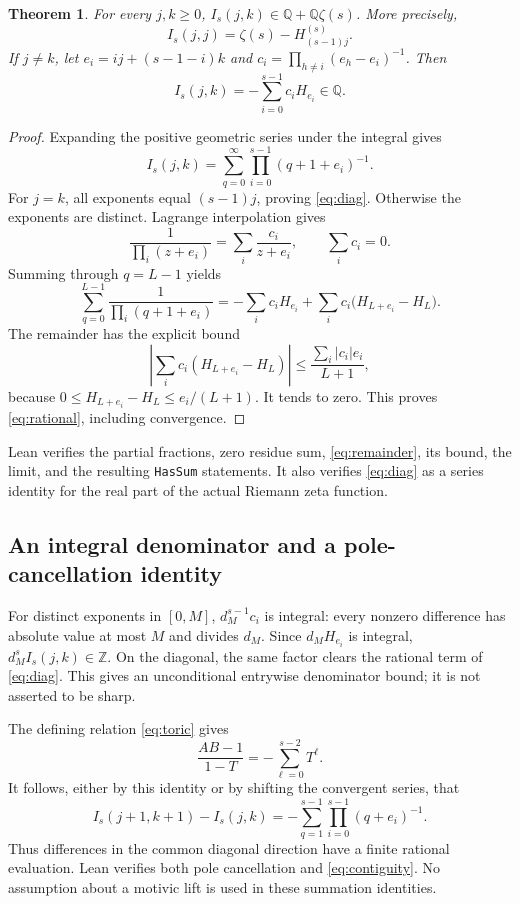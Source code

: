 \documentclass[11pt]{article}
\newtheorem{theorem}{Theorem}
\newcommand{\Q}{\mathbb Q}
\newcommand{\Z}{\mathbb Z}
\newcommand{\HH}[2]{H_{#1}^{(#2)}}
\begin{document}
\begin{theorem}
For every $j,k\ge0$, $I_s(j,k)\in\Q+\Q\zeta(s)$. More precisely,
\begin{equation}
 I_s(j,j)=\zeta(s)-\HH{(s-1)j}{s}.
 \label{eq:diag}
\end{equation}
If $j\ne k$, let $e_i=ij+(s-1-i)k$ and
$c_i=\prod_{h\ne i}(e_h-e_i)^{-1}$. Then
\begin{equation}
 I_s(j,k)=-\sum_{i=0}^{s-1}c_iH_{e_i}\in\Q .
 \label{eq:rational}
\end{equation}
\end{theorem}
\begin{proof}
Expanding the positive geometric series under the integral gives
\[
 I_s(j,k)=\sum_{q=0}^{\infty}
              \prod_{i=0}^{s-1}(q+1+e_i)^{-1}.
\]
For $j=k$, all exponents equal $(s-1)j$, proving \eqref{eq:diag}.
Otherwise the exponents are distinct. Lagrange interpolation gives
\[
 \frac1{\prod_i(z+e_i)}=\sum_i\frac{c_i}{z+e_i},
 \qquad \sum_i c_i=0 .
\]
Summing through $q=L-1$ yields
\begin{equation}
 \sum_{q=0}^{L-1}\frac1{\prod_i(q+1+e_i)}
 =-\sum_i c_iH_{e_i}
   +\sum_i c_i\bigl(H_{L+e_i}-H_L\bigr).
 \label{eq:remainder}
\end{equation}
The remainder has the explicit bound
\[
 \left|\sum_i c_i(H_{L+e_i}-H_L)\right|
 \le\frac{\sum_i|c_i|e_i}{L+1},
\]
because $0\le H_{L+e_i}-H_L\le e_i/(L+1)$. It tends to zero.
This proves \eqref{eq:rational}, including convergence.
\end{proof}
Lean verifies the partial fractions, zero residue sum,
\eqref{eq:remainder}, its bound, the limit, and the resulting
\texttt{HasSum} statements. It also verifies \eqref{eq:diag} as a series
identity for the real part of the actual Riemann zeta function.

\subsection{An integral denominator and a pole-cancellation identity}
For distinct exponents in $[0,M]$, $d_M^{s-1}c_i$ is integral: every
nonzero difference has absolute value at most $M$ and divides $d_M$.
Since $d_MH_{e_i}$ is integral, $d_M^s I_s(j,k)\in\Z$.
On the diagonal, the same factor clears the rational term of
\eqref{eq:diag}. This gives an unconditional entrywise denominator
bound; it is not asserted to be sharp.

The defining relation \eqref{eq:toric} gives
\[
 \frac{AB-1}{1-T}=-\sum_{\ell=0}^{s-2}T^\ell.
\]
It follows, either by this identity or by shifting the convergent series,
that
\begin{equation}
 I_s(j+1,k+1)-I_s(j,k)
 =-\sum_{q=1}^{s-1}\prod_{i=0}^{s-1}(q+e_i)^{-1}.
 \label{eq:contiguity}
\end{equation}
Thus differences in the common diagonal direction have a finite rational
evaluation. Lean verifies both pole cancellation and
\eqref{eq:contiguity}. No assumption about a motivic lift is used in
these summation identities.
\end{document}
